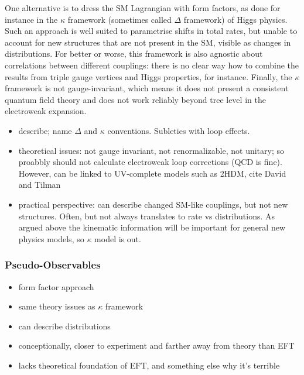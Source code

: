 One alternative is to dress the SM Lagrangian with form factors, as
done for instance in the $\kappa$ framework (sometimes called $\Delta$
framework) of Higgs physics. Such an approach is well suited to
parametrise shifts in total rates, but unable to account for new
structures that are not present in the SM, visible as changes in
distributions. For better or worse, this framework is also agnostic
about correlations between different couplings: there is no clear way
how to combine the results from triple gauge vertices and Higgs
properties, for instance. Finally, the $\kappa$ framework is not
gauge-invariant, which means it does not present a consistent quantum
field theory and does not work reliably beyond tree level in the
electroweak expansion.


\begin{itemize}
\item describe; name $\Delta$ and $\kappa$ conventions. Subleties with
  loop effects.
%
\item theoretical issues: not gauge invariant, not renormalizable, not
  unitary; so proabbly should not calculate electroweak loop
  corrections (QCD is fine). However, can be linked to UV-complete
  models such as 2HDM, cite David and Tilman
%
\item practical perspective: can describe changed SM-like couplings,
  but not new structures. Often, but not always translates to rate vs
  distributions. As argued above the kinematic information will be
  important for general new physics models, so $\kappa$ model is out.
\end{itemize}

\subsubsection{Pseudo-Observables}



\begin{itemize}
\item form factor approach
%
\item same theory issues as $\kappa$ framework
%
\item can describe distributions
%
\item conceptionally, closer to experiment and farther away from theory than EFT
%
\item lacks theoretical foundation of EFT, and something else why it's terrible
\end{itemize}

